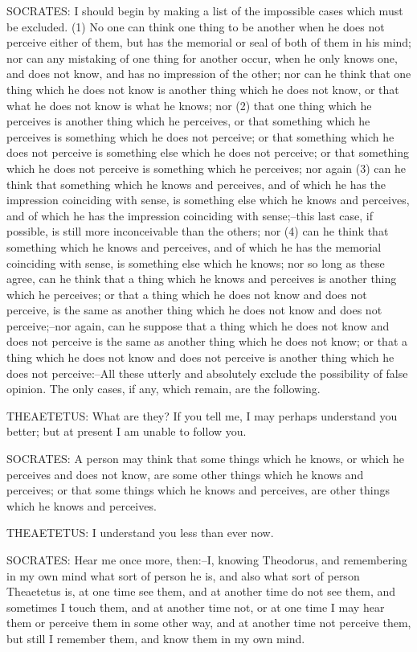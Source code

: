 SOCRATES: I should begin by making a list of the impossible cases which
must be excluded. (1) No one can think one thing to be another when he
does not perceive either of them, but has the memorial or seal of both
of them in his mind; nor can any mistaking of one thing for another
occur, when he only knows one, and does not know, and has no impression
of the other; nor can he think that one thing which he does not know is
another thing which he does not know, or that what he does not know
is what he knows; nor (2) that one thing which he perceives is another
thing which he perceives, or that something which he perceives is
something which he does not perceive; or that something which he does
not perceive is something else which he does not perceive; or that
something which he does not perceive is something which he perceives;
nor again (3) can he think that something which he knows and perceives,
and of which he has the impression coinciding with sense, is something
else which he knows and perceives, and of which he has the impression
coinciding with sense;--this last case, if possible, is still more
inconceivable than the others; nor (4) can he think that something which
he knows and perceives, and of which he has the memorial coinciding with
sense, is something else which he knows; nor so long as these agree,
can he think that a thing which he knows and perceives is another thing
which he perceives; or that a thing which he does not know and does not
perceive, is the same as another thing which he does not know and does
not perceive;--nor again, can he suppose that a thing which he does not
know and does not perceive is the same as another thing which he does
not know; or that a thing which he does not know and does not perceive
is another thing which he does not perceive:--All these utterly and
absolutely exclude the possibility of false opinion. The only cases, if
any, which remain, are the following.

THEAETETUS: What are they? If you tell me, I may perhaps understand you
better; but at present I am unable to follow you.

SOCRATES: A person may think that some things which he knows, or which
he perceives and does not know, are some other things which he knows and
perceives; or that some things which he knows and perceives, are other
things which he knows and perceives.

THEAETETUS: I understand you less than ever now.

SOCRATES: Hear me once more, then:--I, knowing Theodorus, and
remembering in my own mind what sort of person he is, and also what sort
of person Theaetetus is, at one time see them, and at another time do
not see them, and sometimes I touch them, and at another time not, or
at one time I may hear them or perceive them in some other way, and at
another time not perceive them, but still I remember them, and know them
in my own mind.


